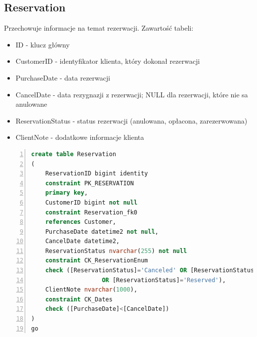 \documentclass[]{article}
\begin{document}
	\subsection{Reservation}
	Przechowuje informacje na temat rezerwacji. Zawartość tabeli:
	\begin{itemize}
		\item ID - klucz główny
		\item CustomerID - identyfikator klienta, który dokonał rezerwacji
		\item PurchaseDate - data rezerwacji
		\item CancelDate - data rezygnazji z rezerwacji; NULL dla rezerwacji, które nie sa anulowane
		\item ReservationStatus - status rezerwacji (anulowana, opłacona, zarezerwowana)
		\item ClientNote - dodatkowe informacje klienta
	\end{itemize}
	\begin{lstlisting}[language=SQL,
						showspaces=false,
						basicstyle=\ttfamily,
						numbers=left,
						numberstyle=\tiny,
						backgroundcolor=\color{lightg},
						keywordstyle=\color{lightblue},
						commentstyle=\color{gray}]
create table Reservation
(
	ReservationID bigint identity
	constraint PK_RESERVATION
	primary key,
	CustomerID bigint not null
	constraint Reservation_fk0
	references Customer,
	PurchaseDate datetime2 not null,
	CancelDate datetime2,
	ReservationStatus nvarchar(255) not null
	constraint CK_ReservationEnum
	check ([ReservationStatus]='Canceled' OR [ReservationStatus]='Paid'
					OR [ReservationStatus]='Reserved'),
	ClientNote nvarchar(1000),
	constraint CK_Dates
	check ([PurchaseDate]<[CancelDate])
)
go
	\end{lstlisting}
\end{document}
